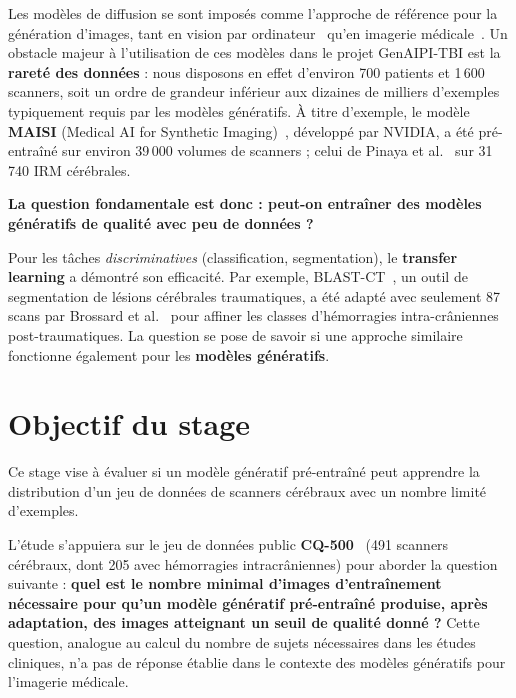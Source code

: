 \documentclass[11pt,a4paper]{article}
\begin{document}
Les modèles de diffusion se sont imposés comme l'approche de référence pour la 
génération d'images, tant en vision par ordinateur~\cite{croitoru2023tpami} qu'en 
imagerie médicale~\cite{kazerouni2023media}. Un obstacle majeur à l'utilisation de ces modèles
dans le projet GenAIPI-TBI est la \textbf{rareté des données} : nous disposons en effet d'environ
700 patients et 1\,600 scanners, soit un ordre de grandeur inférieur aux dizaines de
milliers d'exemples typiquement requis par les modèles génératifs. À titre d'exemple,
le modèle \textbf{MAISI} (Medical AI for Synthetic Imaging)~\cite{guo2024maisi}, 
développé par NVIDIA, a été pré-entraîné sur environ 39\,000 volumes de scanners ;
celui de Pinaya et al.~\cite{pinaya2022brain} sur 31\,740 IRM cérébrales.

\textbf{La question fondamentale est donc : peut-on entraîner des modèles génératifs
de qualité avec peu de données ?}

Pour les tâches \emph{discriminatives} (classification, segmentation), le
\textbf{transfer learning} a démontré son efficacité. Par exemple,
BLAST-CT~\cite{monteiro2020blastct}, un outil de segmentation de lésions cérébrales
traumatiques, a été adapté avec seulement 87 scans par Brossard et
al.~\cite{brossard2023til} pour affiner les classes d'hémorragies intra-crâniennes
post-traumatiques.
La question se pose de savoir si une approche similaire fonctionne également pour les
\textbf{modèles génératifs}.

\section*{Objectif du stage}

Ce stage vise à évaluer si un modèle génératif pré-entraîné peut apprendre la
distribution d'un jeu de données de scanners cérébraux avec un nombre limité
d'exemples.

L'étude s'appuiera sur le jeu de données public
\textbf{CQ-500}~\cite{chilamkurthy2018cq500} (491 scanners cérébraux, dont 205 avec
hémorragies intracrâniennes) pour aborder la question suivante : \textbf{quel est le
nombre minimal d'images d'entraînement nécessaire pour qu'un modèle génératif
pré-entraîné produise, après adaptation, des images atteignant un seuil de qualité
donné ?} Cette question, analogue au calcul du nombre de sujets nécessaires dans les
études cliniques, n'a pas de réponse établie dans le contexte des modèles génératifs
pour l'imagerie médicale.
\end{document}
